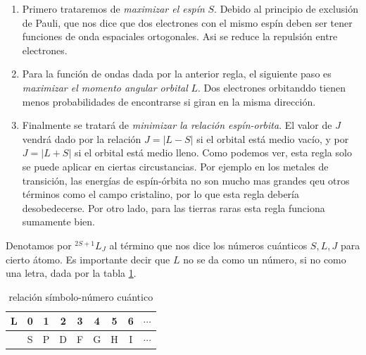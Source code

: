 \documentclass[12pt,a4paper]{book}
\numberwithin{equation}{section}
\numberwithin{figure}{section}
\begin{document}
\begin{enumerate}
    \item Primero trataremos de \textit{maximizar el espín} $S$. Debido al principio de exclusión de Pauli, que nos dice que dos electrones con el mismo espín deben ser tener funciones de onda espaciales ortogonales. Asi se reduce la repulsión entre electrones. 

    \item Para la función de ondas dada por la anterior regla, el siguiente paso es \textit{maximizar el momento angular orbital} $L$. Dos electrones orbitanddo tienen menos probabilidades de encontrarse si giran en la misma dirección. 

    \item Finalmente se tratará de \textit{minimizar la relación espín-orbita}. El valor de $J$ vendrá dado por la relación $J=|L-S|$ si el orbital está medio vacío, y por $J=|L+S|$ si el orbital está medio lleno. Como podemos ver, esta regla solo se puede aplicar en ciertas circustancias. Por ejemplo en los metales de transición, las energías de espín-órbita no son mucho mas grandes qeu otros términos como el campo cristalino, por lo que esta regla debería desobedecerse. Por otro lado, para las tierras raras esta regla funciona sumamente bien. \\
\end{enumerate}

Denotamos por $^{2S+1}L_J$ al término que nos dice los números cuánticos $S,L,J$ para cierto átomo. Es importante decir que $L$ no se da como un número, si no como una letra, dada por la tabla \ref{Tab:02-05-01}.

\begin{table}[h!] 
    \centering
    \begin{tabular}{c|cccccccc}
       L  & 0 & 1 & 2 & 3 & 4 & 5 & 6 & $ \cdots $  \\ \hline
          & S & P & D & F & G & H & I & $ \cdots $ 
    \end{tabular}
    \caption{relación símbolo-número cuántico}
    \label{Tab:02-05-01}
\end{table}





\end{document}
